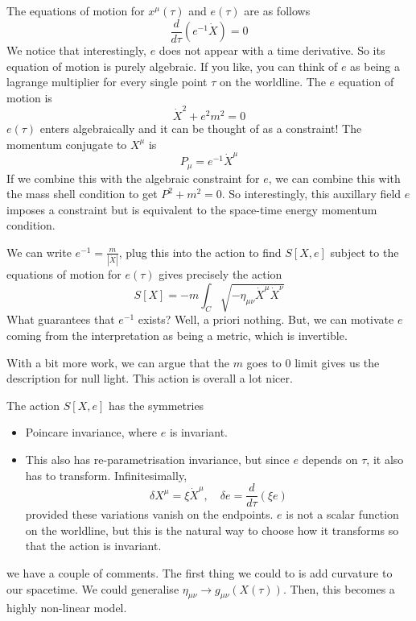 \documentclass[11pt, oneside]{article}   	%
\theoremstyle{slanted}
\begin{document}
The equations of motion for $ x ^ \mu \left( \tau  \right)  $ 
and $ e \left( \tau  \right)  $ are as follows 
\[
	\frac{d }{ d \tau } \left( e ^{ - 1 } \dot{ X }   \right)  = 0 
\] We notice that interestingly, $ e $ does not appear with a time 
derivative. So its equation of 
motion is purely algebraic. If you like, you 
can think of $ e $ as being a lagrange multiplier 
for every single point $ \tau $ on the worldline. 
The $ e $ equation of motion is 
\[
 \dot{ X } ^ 2 + e ^ 2 m ^ 2  = 0  
\] $ e \left( \tau  \right)  $ enters 
algebraically 
and it can be thought of 
as a constraint! 
The momentum conjugate to $ X ^ \mu $ 
is 
\[
 P _ \mu  = e ^{ - 1 } \dot{ X } ^ \mu  
\] If we combine this with the algebraic constraint
for $ e $, we can combine this with the mass shell 
condition 
to get $ P ^ 2 + m ^ 2  = 0 $. 
So interestingly, this auxillary field $ e $ 
imposes a constraint but is equivalent to 
the space-time energy momentum condition. 

We can write $ e ^{ - 1 }  = \frac{ m }{ | \dot{ X }  |  } $, 
plug this into the action 
to find $ S \left[  X , e  \right]  $ 
subject to the equations of motion 
for $ e \left( \tau  \right)  $ gives 
precisely the action 
\[
 S\left[  X  \right]   =  - m \int_{ C } \sqrt{  - \eta _{ \mu \nu } \dot{ X } ^ \mu 
 \dot{ X } ^ \nu  }  
\] What guarantees that $ e ^{ - 1 }  $ exists? 
Well, a priori nothing. But, we 
can motivate $ e $ coming from 
the interpretation as being a metric, 
which is invertible. 

With a bit more work, 
we can argue that the $ m $ goes to 
$ 0 $ limit gives 
us the description for null light. 
This action is overall a lot nicer. 

The action $ S \left[  X , e  \right]  $ has the 
symmetries 
\begin{itemize}
	\item  Poincare invariance, where $ e $ is 
		invariant. 
	\item This also has re-parametrisation 
		invariance, but since $ e $ depends on $ \tau  $, 
		it also has to transform. 
		Infinitesimally, 
		\[
		 \delta X ^ \mu  = \xi \dot{ X } ^ \mu , \quad \delta e  = \frac{ 
		 d }{ d \tau } \left( \xi e  \right)  
		\] provided these variations vanish on the endpoints. 
		$ e $ is not a scalar function on the worldline, 
		but this is the natural way to choose how it 
		transforms so that the action is invariant. 
\end{itemize}
we have a couple of comments. 
The first thing we could to is add curvature 
to our spacetime. 
We could generalise $ \eta _{ \mu \nu } \to g _{ \mu \nu } \left( X \left( \tau  \right)   \right)  $. Then, this becomes 
a highly non-linear model. 
 
\end{document}
